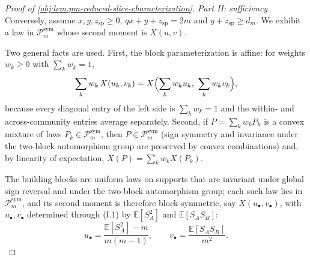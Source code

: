 \documentclass[11pt]{article}
\begin{document}
\begin{proof}[Proof of \cref{obj:lem:pm-reduced-slice-characterization}]
\emph{Part II: sufficiency.}  Conversely, assume \(x,y,z_{\mathrm{sp}}\ge0\), \(qx+y+z_{\mathrm{sp}}=2m\) and \(y+z_{\mathrm{sp}}\ge d_m\).  We exhibit a law in \(\mathcal P_m^{\mathrm{sym}}\) whose second moment is \(X(u,v)\).

Two general facts are used.  First, the block parameterization is affine: for weights \(w_k\ge0\) with \(\sum_kw_k=1\),
\[
\sum_k w_k\,X(u_k,v_k)=X\Bigl(\sum_k w_ku_k,\ \sum_k w_kv_k\Bigr),
\]
because every diagonal entry of the left side is \(\sum_kw_k=1\) and the within- and across-community entries average separately. %
Second, if \(P=\sum_kw_kP_k\) is a convex mixture of laws \(P_k\in\mathcal P_m^{\mathrm{sym}}\), then \(P\in\mathcal P_m^{\mathrm{sym}}\) (sign symmetry and invariance under the two-block automorphism group are preserved by convex combinations) and, by linearity of expectation, \(X(P)=\sum_kw_kX(P_k)\). %

The building blocks are uniform laws on supports that are invariant under global sign reversal and under the two-block automorphism group; each such law lies in \(\mathcal P_m^{\mathrm{sym}}\), and its second moment is therefore block-symmetric, say \(X(u_\bullet,v_\bullet)\), with \(u_\bullet,v_\bullet\) determined through (I.1) by \(\mathbb E[S_A^2]\) and \(\mathbb E[S_AS_B]\):
\[
u_\bullet=\frac{\mathbb E[S_A^2]-m}{m(m-1)},
\qquad
v_\bullet=\frac{\mathbb E[S_AS_B]}{m^2}.
\]


\end{proof}
\end{document}
